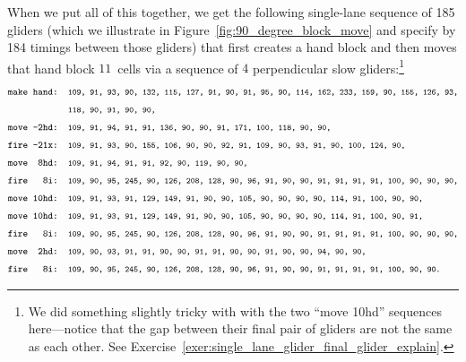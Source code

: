 When we put all of this together, we get the following single-lane sequence of 185 gliders (which we illustrate in Figure~\ref{fig:90_degree_block_move} and specify by 184 timings between those gliders) that first creates a hand block and then moves that hand block $11$~cells via a sequence of $4$ perpendicular slow gliders:\footnote{We did something slightly tricky with with the two ``move 10hd'' sequences here---notice that the gap between their final pair of gliders are not the same as each other. See Exercise~\ref{exer:single_lane_glider_final_glider_explain}.}
\begin{align*}
		& \text{\texttt{\footnotesize make hand: {\scriptsize 109, 91, 93, 90, 132, 115, 127, 91, 90, 91, 95, 90, 114, 162, 233, 159, 90, 155, 126, 93,}}} \\
		& \text{\texttt{\footnotesize ~~~~~~~~~~~~{\scriptsize 118, 90, 91, 90, 90,}}} \\
		& \text{\texttt{\footnotesize move -2hd: {\scriptsize 109, 91, 94, 91, 91, 136, 90, 90, 91, 171, 100, 118, 90, 90,}}} \\
		& \text{\texttt{\footnotesize fire -21x: {\scriptsize 109, 91, 93, 90, 155, 106, 90, 90, 92, 91, 109, 90, 93, 91, 90, 100, 124, 90,}}} \\
		& \text{\texttt{\footnotesize move~~8hd: {\scriptsize 109, 91, 94, 91, 91, 92, 90, 119, 90, 90,}}} \\
		& \text{\texttt{\footnotesize fire~~~8i: {\scriptsize 109, 90, 95, 245, 90, 126, 208, 128, 90, 96, 91, 90, 90, 91, 91, 91, 91, 100, 90, 90, 90,}}} \\
		& \text{\texttt{\footnotesize move~10hd: {\scriptsize 109, 91, 93, 91, 129, 149, 91, 90, 90, 105, 90, 90, 90, 90, 114, 91, 100, 90, 90,}}} \\
		& \text{\texttt{\footnotesize move~10hd: {\scriptsize 109, 91, 93, 91, 129, 149, 91, 90, 90, 105, 90, 90, 90, 90, 114, 91, 100, 90, 91,}}} \\
		& \text{\texttt{\footnotesize fire~~~8i: {\scriptsize 109, 90, 95, 245, 90, 126, 208, 128, 90, 96, 91, 90, 90, 91, 91, 91, 91, 100, 90, 90, 90,}}} \\
		& \text{\texttt{\footnotesize move~~2hd: {\scriptsize 109, 90, 93, 91, 91, 90, 90, 91, 91, 90, 90, 91, 90, 90, 94, 90, 90,}}} \\
		& \text{\texttt{\footnotesize fire~~~8i: {\scriptsize 109, 90, 95, 245, 90, 126, 208, 128, 90, 96, 91, 90, 90, 91, 91, 91, 91, 100, 90, 90.}}}
\end{align*}

